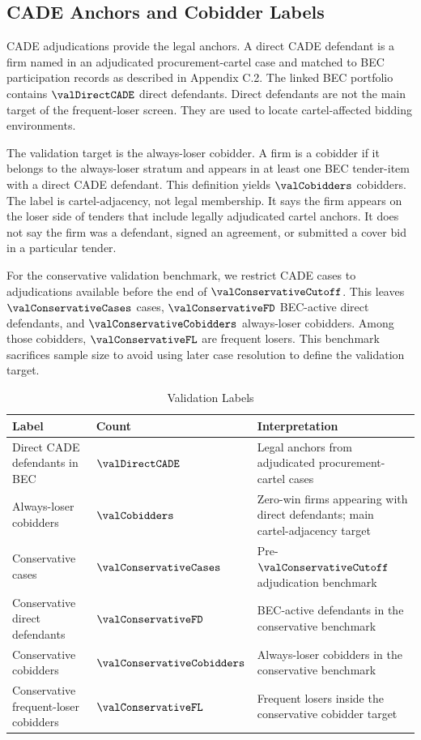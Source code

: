 \subsection{CADE Anchors and Cobidder Labels}
\label{app:cade_labels_submission}

CADE adjudications provide the legal anchors. A direct CADE
defendant is a firm named in an adjudicated procurement-cartel
case and matched to BEC participation records as described in
Appendix C.2. The linked BEC portfolio
contains $\valDirectCADE$ direct defendants. Direct
defendants are not the main target of the frequent-loser screen.
They are used to locate cartel-affected bidding environments.

The validation target is the always-loser cobidder. A firm is a
cobidder if it belongs to the always-loser stratum and appears in
at least one BEC tender-item with a direct CADE defendant. This
definition yields $\valCobidders$ cobidders. The label is
cartel-adjacency, not legal membership. It says the firm appears
on the loser side of tenders that include legally adjudicated
cartel anchors. It does not say the firm was a defendant, signed
an agreement, or submitted a cover bid in a particular tender.

For the conservative validation benchmark, we restrict CADE cases
to adjudications available before the end of
$\valConservativeCutoff$. This leaves $\valConservativeCases$
cases, $\valConservativeFD$ BEC-active direct defendants, and
$\valConservativeCobidders$ always-loser cobidders. Among those
cobidders, $\valConservativeFL$ are frequent losers. This
benchmark sacrifices sample size to avoid using later case
resolution to define the validation target.

\begin{table}[htbp]
\centering
\caption{Validation Labels}
\label{tab:validation_labels_app_submission}
\footnotesize
\begin{adjustbox}{max width=\textwidth,center}
\begin{tabular}{L{4.0cm}L{2.6cm}L{7.0cm}}
\toprule
Label & Count & Interpretation \\
\midrule
Direct CADE defendants in BEC & $\valDirectCADE$ & Legal anchors from adjudicated procurement-cartel cases \\
Always-loser cobidders & $\valCobidders$ & Zero-win firms appearing with direct defendants; main cartel-adjacency target \\
Conservative cases & $\valConservativeCases$ & Pre-$\valConservativeCutoff$ adjudication benchmark \\
Conservative direct defendants & $\valConservativeFD$ & BEC-active defendants in the conservative benchmark \\
Conservative cobidders & $\valConservativeCobidders$ & Always-loser cobidders in the conservative benchmark \\
Conservative frequent-loser cobidders & $\valConservativeFL$ & Frequent losers inside the conservative cobidder target \\
\bottomrule
\end{tabular}
\end{adjustbox}
\end{table}

